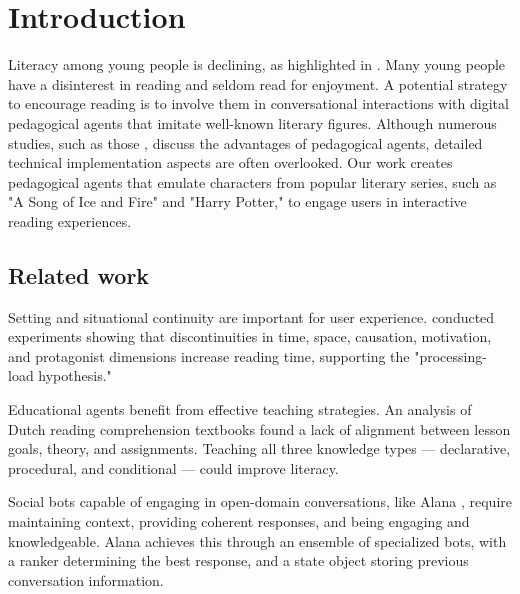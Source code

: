 \documentclass[fleqn,moreauthors,10pt]{ds_report}
\affiliation{\textit{Advisors: Slavko Žitnik}}
\begin{document}
\flushbottom

\maketitle

\thispagestyle{empty}


\section*{Introduction}

Literacy among young people is declining, as highlighted in \cite{murray2021literacy}.
Many young people have a disinterest in reading and seldom read for enjoyment.
A potential strategy to encourage reading is to involve them in conversational interactions with digital pedagogical agents that imitate well-known literary figures.
Although numerous studies, such as those \cite{nielen2018digital,alaimi2020pedagogical}, discuss the advantages of pedagogical agents, detailed technical implementation aspects are often overlooked.
Our work creates pedagogical agents that emulate characters from popular literary series, such as "A Song of Ice and Fire" and "Harry Potter," to engage users in interactive reading experiences.

\subsection*{Related work}
Setting and situational continuity are important for user experience. \cite{situation_models} conducted experiments showing that discontinuities in time, space, causation, motivation, and protagonist dimensions increase reading time, supporting the "processing-load hypothesis."

Educational agents benefit from effective teaching strategies. An analysis of Dutch reading comprehension textbooks \cite{bogaerds2022textbooks} found a lack of alignment between lesson goals, theory, and assignments. Teaching all three knowledge types — declarative, procedural, and conditional — could improve literacy.

Social bots capable of engaging in open-domain conversations, like Alana \cite{papaioannou2022designing}, require maintaining context, providing coherent responses, and being engaging and knowledgeable. Alana achieves this through an ensemble of specialized bots, with a ranker determining the best response, and a state object storing previous conversation information.
\end{document}
